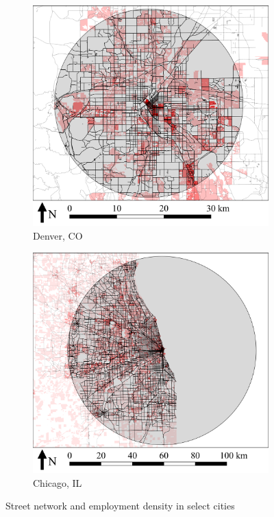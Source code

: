 \documentclass{elsarticle}\usepackage[]{graphicx}\usepackage[]{color}
\begin{document}
\begin{figure}[H]
     \begin{subfigure}[b]{0.49\textwidth}
         \centering
		 \includegraphics[width=\textwidth]{den_vicmap}
        \caption{Denver, CO}
         \label{fig:denmap}
     \end{subfigure}
         \hfill       
     \begin{subfigure}[b]{0.49\textwidth}
         \centering
		 \includegraphics[width=\textwidth]{chi_vicmap}
        \caption{Chicago, IL}
         \label{fig:chimap}
     \end{subfigure}
     
	\caption{Street network and employment density in select cities}
    \label{fig:vicmap}
\end{figure}
\end{document}
